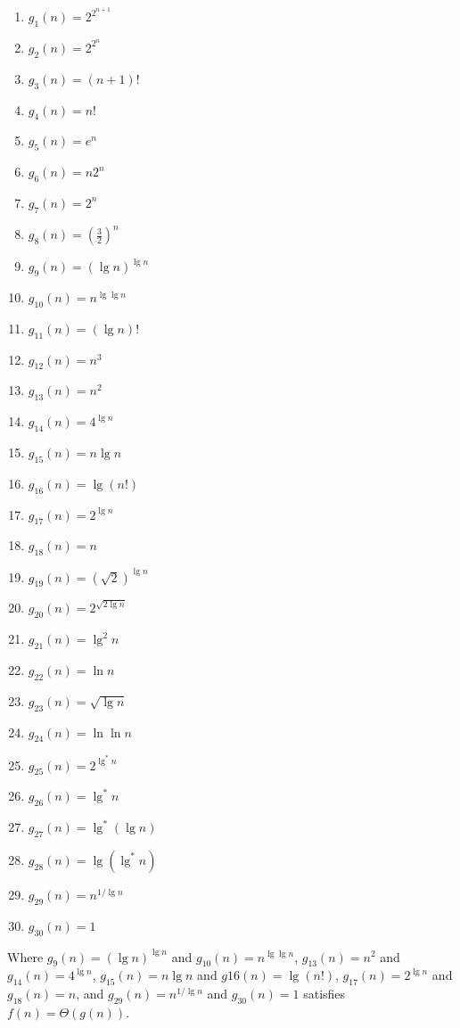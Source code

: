 \documentclass{article}
\theoremstyle{plain}
\begin{document}
\begin{enumerate}
    \item[{}] $g_1(n) = 2^{2^{n+1}}$
    \item[{}] $g_2(n) = 2^{2^{n}}$
    \item[{}] $g_3(n) = (n+1)!$
    \item[{}] $g_4(n) = n!$
    \item[{}] $g_5(n) = e^n$
    \item[{}] $g_6(n) = n2^n$
    \item[{}] $g_7(n) = 2^n$
    \item[{}] $g_8(n) = (\frac{3}{2})^n$
    \item[{}] $g_9(n) = (\lg n)^{\lg n}$
    \item[{}] $g_{10}(n) = n^{\lg \lg n}$
    \item[{}] $g_{11}(n) = (\lg n)!$
    \item[{}] $g_{12}(n) = n^3$
    \item[{}] $g_{13}(n) = n^2$
    \item[{}] $g_{14}(n) = 4^{\lg n}$
    \item[{}] $g_{15}(n) = n \lg n$
    \item[{}] $g_{16}(n) = \lg (n!)$
    \item[{}] $g_{17}(n) = 2^{\lg n}$
    \item[{}] $g_{18}(n) = n$
    \item[{}] $g_{19}(n) = (\sqrt{2})^{\lg n}$
    \item[{}] $g_{20}(n) = 2^{\sqrt{2 \lg n}}$
    \item[{}] $g_{21}(n) = \lg ^ 2 n$
    \item[{}] $g_{22}(n) = \ln n$
    \item[{}] $g_{23}(n) = \sqrt{\lg n}$
    \item[{}] $g_{24}(n) = \ln \ln n$
    \item[{}] $g_{25}(n) = 2^{\lg ^ * n}$
    \item[{}] $g_{26}(n) = \lg ^ * n$
    \item[{}] $g_{27}(n) = \lg ^ * (\lg n)$
    \item[{}] $g_{28}(n) = \lg (\lg ^ * n)$
    \item[{}] $g_{29}(n) = n^{1/{\lg n}}$
    \item[{}] $g_{30}(n) = 1$
\end{enumerate}
Where $g_9(n) = (\lg n)^{\lg n}$ and $g_{10}(n) = n^{\lg \lg n}$, $g_{13}(n) = n^2$ and $g_{14}(n) = 4^{\lg n}$, $g_{15}(n) = n \lg n$ and $g{16}(n) = \lg (n!)$, $g_{17}(n) = 2^{\lg n}$ and $g_{18}(n) = n$, and $g_{29}(n) = n^{1/{\lg n}}$ and $g_{30}(n) = 1$ satisfies $f(n)=\Theta(g(n))$.\\
\end{document}
